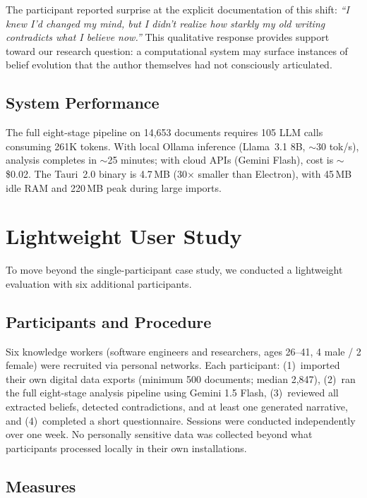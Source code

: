 \documentclass[pdflatex,sn-mathphys-num]{sn-jnl}
\begin{document}
The participant reported surprise at the explicit documentation of this shift: \emph{``I knew I'd changed my mind, but I didn't realize how starkly my old writing contradicts what I believe now.''} This qualitative response provides support toward our research question: a computational system may surface instances of belief evolution that the author themselves had not consciously articulated.

\subsection{System Performance}

The full eight-stage pipeline on 14,653 documents requires 105 LLM calls consuming 261K tokens. With local Ollama inference (Llama~3.1 8B, ${\sim}$30 tok/s), analysis completes in ${\sim}$25 minutes; with cloud APIs (Gemini Flash), cost is ${\sim}$\$0.02. The Tauri~2.0 binary is 4.7\,MB (30$\times$ smaller than Electron), with 45\,MB idle RAM and 220\,MB peak during large imports.

\section{Lightweight User Study}\label{sec:userstudy}

To move beyond the single-participant case study, we conducted a lightweight evaluation with six additional participants.

\subsection{Participants and Procedure}

Six knowledge workers (software engineers and researchers, ages 26--41, 4 male / 2 female) were recruited via personal networks. Each participant: (1)~imported their own digital data exports (minimum 500 documents; median 2,847), (2)~ran the full eight-stage analysis pipeline using Gemini 1.5 Flash, (3)~reviewed all extracted beliefs, detected contradictions, and at least one generated narrative, and (4)~completed a short questionnaire. Sessions were conducted independently over one week. No personally sensitive data was collected beyond what participants processed locally in their own installations.

\subsection{Measures}
\end{document}

